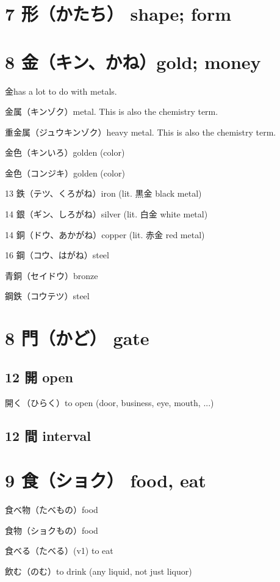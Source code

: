 \section{7 形（かたち） shape; form}

\section{8 金（キン、かね）gold; money}

金has a lot to do with metals.

金属（キンゾク）metal. This is also the chemistry term.

重金属（ジュウキンゾク）heavy metal. This is also the chemistry term.

金色（キンいろ）golden (color)

金色（コンジキ）golden (color)

13 鉄（テツ、くろがね）iron (lit. 黒金 black metal)

14 銀（ギン、しろがね）silver (lit. 白金 white metal)

14 銅（ドウ、あかがね）copper (lit. 赤金 red metal)

16 鋼（コウ、はがね）steel

青銅（セイドウ）bronze

鋼鉄（コウテツ）steel

\section{8 門（かど） gate}

\subsection{12 開 open}

開く（ひらく）to open (door, business, eye, mouth, ...)

\subsection{12 間 interval}

\section{9 食（ショク） food, eat}

食べ物（たべもの）food

食物（ショクもの）food

食べる（たべる）(v1) to eat

飲む（のむ）to drink (any liquid, not just liquor)

